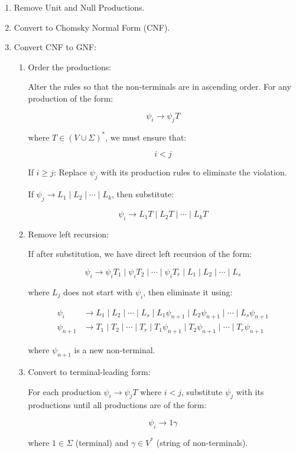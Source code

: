 \documentclass[12pt,a4paper,openany]{article}
\begin{document}
\begin{enumerate}
    \item Remove Unit and Null Productions.
    
    \item Convert to Chomsky Normal Form (CNF). 
    
    \item Convert CNF to GNF:
    
    \begin{enumerate}[label=\alph*)]
        \item Order the productions:
        
        Alter the rules so that the non-terminals are in ascending order. For any production of the form:
        
        \[
        \psi_i \to \psi_jT
        \]

        where $T \in (V \cup \Sigma)^*$, we must ensure that:
        
        \[
        i < j
        \]
        
        If $i \geq j$: Replace $\psi_j$ with its production rules to eliminate the violation.
        
        
        If $\psi_j \to L_1 \mid L_2 \mid \cdots \mid L_k$, then substitute:
        
        \[
        \psi_i \to L_1T \mid L_2T \mid \cdots \mid L_kT
        \]
        
        \item Remove left recursion:
        
        If after substitution, we have direct left recursion of the form:

        \[
        \psi_i \to \psi_iT_1 \mid \psi_iT_2 \mid \cdots \mid \psi_iT_r \mid L_1 \mid L_2 \mid \cdots \mid L_s
        \]
        
        where $L_j$ does not start with $\psi_i$, then eliminate it using:
        
        \[
        \begin{aligned}
        \psi_i &\to L_1 \mid L_2 \mid \cdots \mid L_s \mid L_1\psi_{n+1} \mid L_2\psi_{n+1} \mid \cdots \mid L_s\psi_{n+1} \\
        \psi_{n+1} &\to T_1 \mid T_2 \mid \cdots \mid T_r \mid T_1\psi_{n+1} \mid T_2\psi_{n+1} \mid \cdots \mid T_r\psi_{n+1}
        \end{aligned}
        \]
        
        where $\psi_{n+1}$ is a new non-terminal.
        
        \item Convert to terminal-leading form:
        
        For each production $\psi_i \to \psi_jT$ where $i < j$, substitute $\psi_j$ with its productions until all productions are of the form:
        
        \[
        \psi_i \to 1\gamma
        \]

        where $1 \in \Sigma$ (terminal) and $\gamma \in V^*$ (string of non-terminals).
    \end{enumerate}
\end{enumerate}
\end{document}
